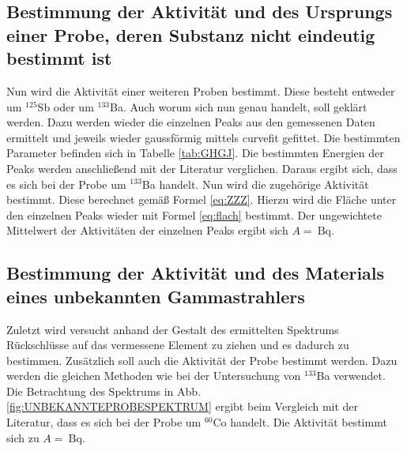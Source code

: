 \subsection{Bestimmung der Aktivität und des Ursprungs einer Probe, deren Substanz nicht eindeutig bestimmt ist}
Nun wird die Aktivität einer weiteren Proben bestimmt. Diese besteht entweder um $^{125}$Sb oder um $^{133}$Ba. Auch worum sich nun genau handelt, soll geklärt werden. Dazu werden wieder die einzelnen Peaks aus den gemessenen Daten ermittelt und jeweils wieder gaussförmig mittels curvefit\cite{scipy} gefittet. Die bestimmten Parameter befinden sich in Tabelle \ref{tab:GHGJ}. Die bestimmten Energien der Peaks werden anschließend mit der Literatur\cite{V18} verglichen. Daraus ergibt sich, dass es sich bei der Probe um $^{133}$Ba handelt. Nun wird die zugehörige Aktivität bestimmt. Diese berechnet gemäß Formel \eqref{eq:ZZZ}. Hierzu wird die Fläche unter den einzelnen Peaks wieder mit Formel \eqref{eq:flach} bestimmt. Der ungewichtete Mittelwert der Aktivitäten der einzelnen Peaks ergibt sich $A = \SI{}{\becquerel}$.


\subsection{Bestimmung der Aktivität und des Materials eines unbekannten Gammastrahlers}
Zuletzt wird versucht anhand der Gestalt des ermittelten Spektrums Rückschlüsse auf das vermessene Element zu ziehen und es dadurch zu bestimmen. Zusätzlich soll auch die Aktivität der Probe bestimmt werden. Dazu werden die gleichen Methoden wie bei der Untersuchung von $^{133}$Ba verwendet. Die Betrachtung des Spektrums in Abb. \ref{fig:UNBEKANNTEPROBESPEKTRUM} ergibt beim Vergleich mit der Literatur, dass es sich bei der Probe um $^{60}$Co handelt. Die Aktivität bestimmt sich zu $A = \SI{}{\becquerel}$.